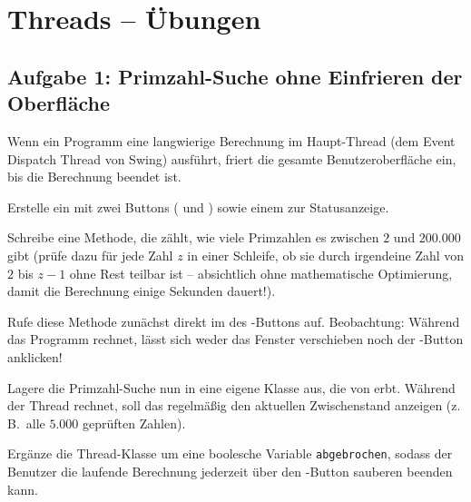 \clearpage

\rehead[]{\textcolor{lightblue}{AvHG, Inf, My}}
\lohead[]{\textcolor{lightblue}{AvHG, Inf, My}}

\section{Threads -- Übungen}

\subsection{Aufgabe 1: Primzahl-Suche ohne Einfrieren der Oberfläche}

Wenn ein Programm eine langwierige Berechnung im Haupt-Thread (dem Event
Dispatch Thread von Swing) ausführt, friert die gesamte Benutzeroberfläche ein,
bis die Berechnung beendet ist.

\begin{compactenum}[a)]
\item Erstelle ein  mit zwei Buttons ( und
) sowie einem  zur Statusanzeige.

Schreibe eine Methode, die zählt, wie viele Primzahlen es zwischen $2$ und
$200.000$ gibt (prüfe dazu für jede Zahl $z$ in einer Schleife, ob sie durch
irgendeine Zahl von $2$ bis $z - 1$ ohne Rest teilbar ist -- absichtlich ohne
mathematische Optimierung, damit die Berechnung einige Sekunden dauert!).

Rufe diese Methode zunächst direkt im  des
-Buttons auf. Beobachtung: Während das Programm rechnet,
lässt sich weder das Fenster verschieben noch der -Button
anklicken!

\item Lagere die Primzahl-Suche nun in eine eigene Klasse aus, die von
 erbt. Während der Thread rechnet, soll das 
regelmäßig den aktuellen Zwischenstand anzeigen (z.\,B.\ alle $5.000$ geprüften
Zahlen).

\item Ergänze die Thread-Klasse um eine boolesche Variable
\lstinline|abgebrochen|, sodass der Benutzer die laufende Berechnung jederzeit
über den -Button sauberen beenden kann.
\end{compactenum}


